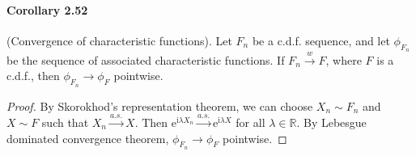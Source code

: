 \documentclass{article}
\numberwithin{equation}{section}
\newcommand{\e}{\mathrm{e}}
\renewcommand{\i}{\mathrm{i}}
\theoremstyle{plain}
\theoremstyle{definition}
\begin{document}
\paragraph{Corollary 2.52\label{cor:2.52}} (Convergence of characteristic functions). Let $F_n$ be a c.d.f. sequence, and let $\phi_{F_n}$ be the sequence of associated characteristic functions. If $F_n\overset{w}{\to}F$, where $F$ is a c.d.f., then $\phi_{F_n}\to\phi_F$ pointwise.
\begin{proof}
By Skorokhod's representation theorem, we can choose $X_n\sim F_n$ and $X\sim F$ such that $X_n\overset{a.s.}{\to}X$. Then $\e^{\i\lambda X_n}\overset{a.s.}{\to}\e^{\i\lambda X}$ for all $\lambda\in\mathbb{R}$. By Lebesgue dominated convergence theorem, $\phi_{F_n}\to\phi_F$ pointwise.
\end{proof}
\end{document}
